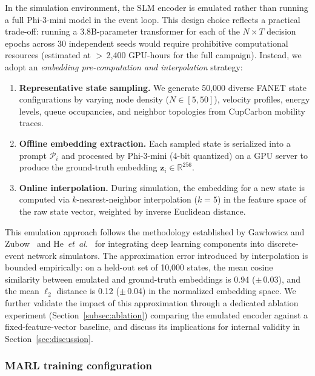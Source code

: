 \documentclass[5p,times]{elsarticle}
\begin{document}
In the simulation environment, the SLM encoder is emulated rather than running a full Phi-3-mini model in the event loop. This design choice reflects a practical trade-off: running a 3.8B-parameter transformer for each of the $N \times T$ decision epochs across 30 independent seeds would require prohibitive computational resources (estimated at $>$\,2,400 GPU-hours for the full campaign). Instead, we adopt an \emph{embedding pre-computation and interpolation} strategy:

\begin{enumerate}
\item \textbf{Representative state sampling.} We generate 50,000 diverse FANET state configurations by varying node density ($N \in [5, 50]$), velocity profiles, energy levels, queue occupancies, and neighbor topologies from CupCarbon mobility traces.
\item \textbf{Offline embedding extraction.} Each sampled state is serialized into a prompt $\mathcal{P}_i$ and processed by Phi-3-mini (4-bit quantized) on a GPU server to produce the ground-truth embedding $\mathbf{z}_i \in \mathbb{R}^{256}$.
\item \textbf{Online interpolation.} During simulation, the embedding for a new state is computed via $k$-nearest-neighbor interpolation ($k=5$) in the feature space of the raw state vector, weighted by inverse Euclidean distance.
\end{enumerate}

This emulation approach follows the methodology established by Gaw{\l}owicz and Zubow~\cite{gawlowicz2019ns3gym} and He~\textit{et~al.}~\cite{he2024large_networking} for integrating deep learning components into discrete-event network simulators. The approximation error introduced by interpolation is bounded empirically: on a held-out set of 10,000 states, the mean cosine similarity between emulated and ground-truth embeddings is 0.94 ($\pm$\,0.03), and the mean $\ell_2$ distance is 0.12 ($\pm$\,0.04) in the normalized embedding space. We further validate the impact of this approximation through a dedicated ablation experiment (Section~\ref{subsec:ablation}) comparing the emulated encoder against a fixed-feature-vector baseline, and discuss its implications for internal validity in Section~\ref{sec:discussion}.

\subsubsection{MARL training configuration}
\end{document}

